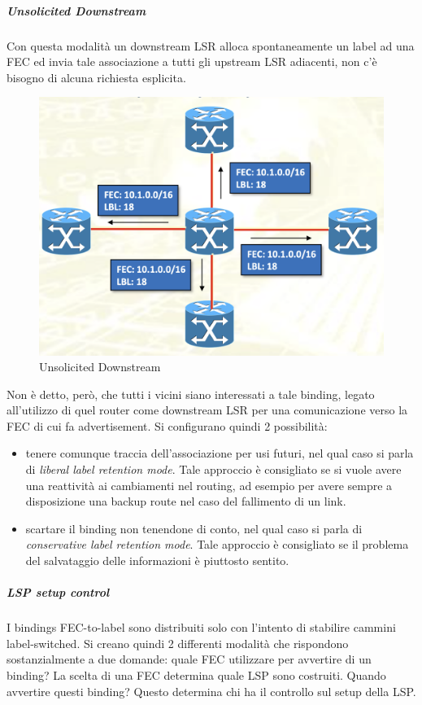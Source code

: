 \documentclass{article}
\begin{document}
\subparagraph{Unsolicited Downstream} Con questa modalità un downstream LSR alloca spontaneamente un label ad una FEC ed invia tale associazione a tutti gli upstream LSR adiacenti, non c'è bisogno di alcuna richiesta esplicita.
\begin{figure}[H]
    \centering
    \includegraphics[scale=0.3]{figures/unsolicited downstream.png}
    \caption{Unsolicited Downstream}
\end{figure}
Non è detto, però, che tutti i vicini siano interessati a tale binding, legato all'utilizzo di quel router come downstream LSR per una comunicazione verso la FEC di cui fa advertisement. Si configurano quindi 2 possibilità:
\begin{itemize}
    \item tenere comunque traccia dell'associazione per usi futuri, nel qual caso si parla di \textit{liberal label retention mode}. Tale approccio è consigliato se si vuole avere una reattività ai cambiamenti nel routing, ad esempio per avere sempre a disposizione una backup route nel caso del fallimento di un link.
    \item scartare il binding non tenendone di conto, nel qual caso si parla di \textit{conservative label retention mode}. Tale approccio è consigliato se il problema del salvataggio delle informazioni è piuttosto sentito.
\end{itemize}

\subparagraph{LSP setup control} I bindings FEC-to-label sono distribuiti solo con l'intento di stabilire cammini label-switched. Si creano quindi 2 differenti modalità che rispondono sostanzialmente a due domande: quale FEC utilizzare per avvertire di un binding? La scelta di una FEC determina quale LSP sono costruiti. Quando avvertire questi binding? Questo determina chi ha il controllo sul setup della LSP.
\end{document}
